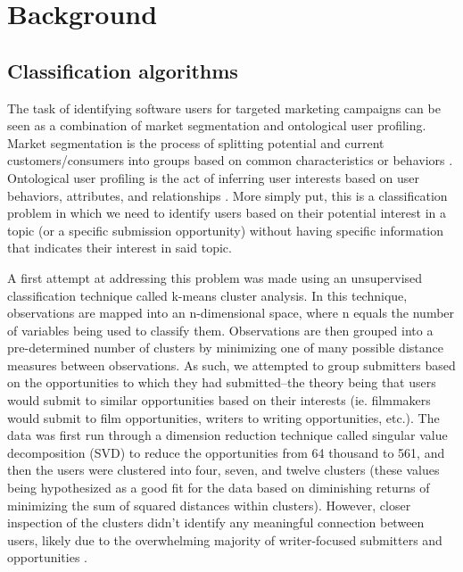 \documentclass[]{report}   %
\begin{document}
\chapter{Background}
\section{Classification algorithms}\label{classification}

The task of identifying software users for targeted marketing campaigns can be seen as a combination of market segmentation and ontological user profiling. Market segmentation is the process of splitting potential and current customers/consumers into groups based on common characteristics or behaviors \cite{johnson_1971}. Ontological user profiling is the act of inferring user interests based on user behaviors, attributes, and relationships \cite{middleton_shadbolt_roure_2004}. More simply put, this is a classification problem in which we need to identify users based on their potential interest in a topic (or a specific submission opportunity) without having specific information that indicates their interest in said topic. 

A first attempt at addressing this problem was made using an unsupervised classification technique called k-means cluster analysis. In this technique, observations are mapped into an n-dimensional space, where n equals the number of variables being used to classify them. Observations are then grouped into a pre-determined number of clusters by minimizing one of many possible distance measures between observations\cite{jain_2010}. As such, we attempted to group submitters based on the opportunities to which they had submitted--the theory being that users would submit to similar opportunities based on their interests (ie. filmmakers would submit to film opportunities, writers to writing opportunities, etc.). The data was first run through a dimension reduction technique called singular value decomposition (SVD) to reduce the opportunities from 64 thousand to 561, and then the users were clustered into four, seven, and twelve clusters (these values being hypothesized as a good fit for the data based on diminishing returns of minimizing the sum of squared distances within clusters). However, closer inspection of the clusters didn't identify any meaningful connection between users, likely due to the overwhelming majority of writer-focused submitters and opportunities \cite{marbut_2018}.
\end{document}
